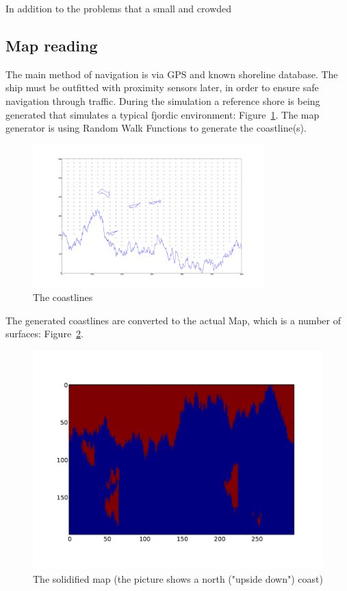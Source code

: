 In addition to the problems that a small and crowded

\subsection{Map reading}

The main method of navigation is via GPS and known shoreline database. The ship must be outfitted with proximity sensors later, in order to ensure safe navigation through traffic. During the simulation a reference shore is being generated that simulates a typical fjordic environment: Figure~\ref{fig:linemap}. The map generator is using Random Walk Functions to generate the coastline(s).

\begin{figure}[H]
	\centering
	\includegraphics[width=0.8\textwidth]{img/linemap}
	\caption{The coastlines}
	\label{fig:linemap}
\end{figure}

The generated coastlines are converted to the actual Map, which is a number of surfaces: Figure~\ref{fig:solidmap}.

\begin{figure}[H]
	\centering
	\includegraphics[width=\textwidth]{img/solidmap}
	\caption{The solidified map (the picture shows a north ("upside down") coast)}
	\label{fig:solidmap}
\end{figure}

